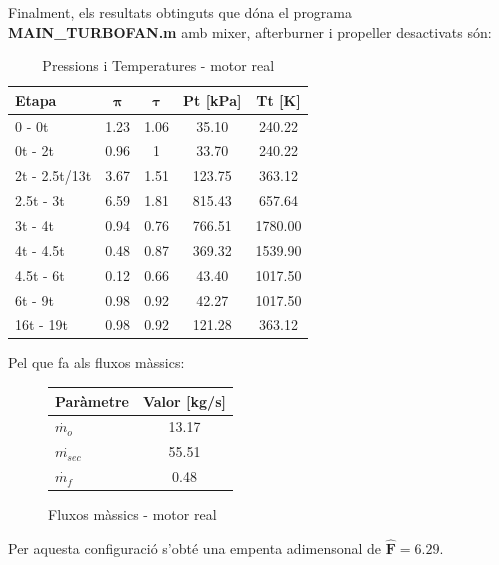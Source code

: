 Finalment, els resultats obtinguts que dóna el programa \textbf{MAIN\_TURBOFAN.m} amb mixer, afterburner i propeller desactivats són:
\begin{table}[H]
\centering
\resizebox{8cm}{!} {
\begin{tabular}{lcccc}
\toprule[3pt]
\textbf{Etapa} &\textbf{$\bm{\pi}$} & \textbf{$\bm{\tau}$}    & \textbf{Pt} [kPa]  & \textbf{Tt} [K]  \\
\midrule[1pt]
0 - 0t      & 1.23   		& 1.06  & 35.10   & 240.22             \\
0t - 2t     & 0.96   		& 1  	& 33.70   & 240.22             \\
2t - 2.5t/13t     & 3.67    & 1.51  & 123.75   & 363.12             \\
2.5t - 3t     & 6.59  		& 1.81  & 815.43  & 657.64            \\
3t - 4t     & 0.94    		& 0.76  & 766.51  & 1780.00             \\
4t - 4.5t     & 0.48        & 0.87  & 369.32  & 1539.90             \\
4.5t - 6t     & 0.12        & 0.66  & 43.40  & 1017.50             \\
6t - 9t     & 0.98          & 0.92  & 42.27  & 1017.50            \\
16t - 19t     & 0.98        & 0.92  & 121.28   & 363.12            \\
\bottomrule[2pt]
\end{tabular}
}
\caption{Pressions i Temperatures - motor real}
\end{table}
Pel que fa als fluxos màssics:
\begin{figure}[H]
	\centering
	\begin{tabular}{lc}
		\toprule[3pt]
		\textbf{Paràmetre}&\textbf{Valor [kg/s]}\\
		\midrule[1pt]
		$\dot{m_{o}}$ & 13.17 \\
		$\dot{m_{sec}}$ & 55.51 \\
		$\dot{m_{f}}$ & 0.48 \\
		\bottomrule[2pt]
	\end{tabular}
	\label{C_opti2}
	\caption{Fluxos màssics - motor real}
\end{figure}
Per aquesta configuració s'obté una empenta adimensonal de $\bm{\hat{F} = 6.29}$.
